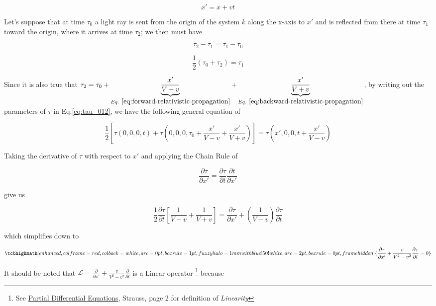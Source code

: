 \[
    x' = x + vt
\]

Let's suppose that at time $\tau_0$ a light ray is sent from the origin of the system $k$ along the x-axis to $x'$ and
is reflected from there at time $\tau_1$ toward the origin, where it arrives at time $\tau_2$; we then must have

\[
    \tau_2 - \tau_1 = \tau_1 - \tau_0
\]

\begin{equation} \label{eq:tau_012}
\frac{1}{2}(\tau_0 + \tau_2) = \tau_1
\end{equation}

Since it is also true that
$\tau_2 = \tau_0 + \underbrace{\frac{x'}{V - v}}_{Eq.~\ref{eq:forward-relativistic-propagation}} + \underbrace{\frac{x'}{V + v}}_{Eq.~\ref{eq:backward-relativistic-propagation}}$,
by writing out the parameters of $\tau$ in Eq.\ref{eq:tau_012}, we have the following general equation of

\begin{equation}
    \frac{1}{2}\left[ \tau(0, 0, 0, t) + \tau\left( 0, 0, 0, \tau_0 + \frac{x'}{V - v} + \frac{x'}{V + v} \right) \right] = \tau\left( x', 0, 0, t + \frac{x'}{V -v} \right)
\end{equation}

Taking the derivative of $\tau$ with respect to $x'$ and applying the Chain Rule of

\[
    \frac{\partial\tau}{\partial x'} = \frac{\partial\tau}{\partial t}\frac{\partial t}{\partial x'}
\]

give us

\begin{equation}
    \frac{1}{2}\frac{\partial\tau}{\partial t}\left[ \frac{1}{V - v} + \frac{1}{V + v} \right] = \frac{\partial\tau}{\partial x'} + \left( \frac{1}{V - v} \right)\frac{\partial\tau}{\partial t}
\end{equation}

which simplifies down to

\begin{equation}\label{eq:tau_t_general}
\tcbhighmath[
    enhanced,colframe=red,colback=white,arc=0pt,boxrule=1pt,
    fuzzy halo=1mm with blue!50!white,
    arc=2pt,
    boxrule=0pt,
    frame hidden
]{
    \frac{\partial\tau}{\partial x'} + \frac{v}{V^2 - v^2}\frac{\partial\tau}{\partial t} = 0
}
\end{equation}

It should be noted that $\mathscr{L} = \frac{\partial}{\partial x'} + \frac{v}{V^2 - v^2}\frac{\partial}{\partial t}$
is a Linear operator
\footnote{See \href{https://trello.com/c/5L46ePJQ}{Partial Differential Equations}, Strauss, page 2 for definition of \textit{Linearity}}
because


